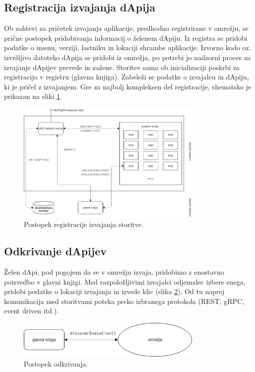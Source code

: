 \documentclass[a4paper, 12pt]{book}
\begin{document}
\subsection{Registracija izvajanja dApija}
\label{registerExecution}
Ob zahtevi za pričetek izvajanja aplikacije, predhodno registrirane v omrežju, se prične postopek pridobivanja informacij o želenem dApiju.
Iz registra se pridobi podatke o imenu, verziji, lastniku in lokaciji shrambe aplikacije.
Izvorno kodo oz. izvršljivo datoteko dApija se pridobi iz omrežja, po potrebi jo nadzorni proces za izvajanje dApijev prevede in zažene.
Storitev sama ob inicializaciji poskrbi za registracijo v registru (glavna knjiga).
Zabeleži se podatke o izvajalcu in dApiju, ki je pričel z izvajanjem.
Gre za najbolj kompleksen del registracije, shematsko je prikazan na sliki \ref{register_service}.

\begin{figure}[h]
	\centering
	\includegraphics[width=0.8\textwidth]{slike/register_service.png}
	\caption{Postopek registracije izvajanja storitve.}
	\label{register_service}
\end{figure}

\subsection{Odkrivanje dApijev}
\label{serviceDiscovery}
Želen dApi, pod pogojem da se v omrežju izvaja, pridobimo z enostavno poizvedbo v glavni knjigi.
Med razpoložljivimi izvajalci odjemalec izbere enega, pridobi podatke o lokaciji izvajanja in izvede klic (slika  \ref{discover_service}).
Od tu naprej komunikacija med storitvami poteka preko izbranega protokola (REST, gRPC, event driven itd.).

\begin{figure}[h]
	\centering
	\includegraphics[width=0.8\textwidth]{slike/discover_service.png}
	\caption{Postopek odkrivanja.}
	\label{discover_service}
\end{figure}
\end{document}
